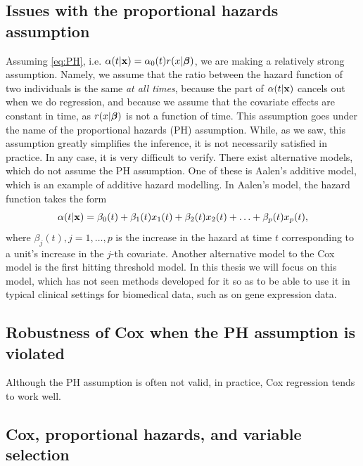 \subsection{Issues with the proportional hazards assumption}
Assuming \eqref{eq:PH}, i.e. $\alpha(t|\mathbf{x})=\alpha_0(t)r(x|\boldsymbol{\beta})$, we are making a relatively strong assumption. Namely, we assume that the ratio between the hazard function of two individuals is the same \textit{at all times}, because the part of $\alpha(t|\mathbf{x})$ cancels out when we do regression, and because we assume that the covariate effects are constant in time, as $r(x|\boldsymbol{\beta})$ is not a function of time.
This assumption goes under the name of the proportional hazards (PH) assumption. While, as we saw, this assumption greatly simplifies the inference, it is not necessarily satisfied in practice. In any case, it is very difficult to verify. There exist alternative models, which do not assume the PH assumption. One of these is Aalen's additive model, which is an example of additive hazard modelling. In Aalen's model, the hazard function takes the form
\begin{equation}
    \alpha(t|\mathbf{x})=\beta_0(t)+\beta_1(t)x_1(t)+\beta_2(t)x_2(t)+\ldots+\beta_p(t)x_p(t),
\end{equation}
where $\beta_j(t),j=1,\ldots,p$ is the increase in the hazard at time $t$ corresponding to a unit's increase in the $j$-th covariate. Another alternative model to the Cox model is the first hitting threshold model. In this thesis we will focus on this model, which has not seen methods developed for it so as to be able to use it in typical clinical settings for biomedical data, such as on gene expression data.

\subsection{Robustness of Cox when the PH assumption is violated}
Although the PH assumption is often not valid, in practice, Cox regression tends to work well. 

\subsection{Cox, proportional hazards, and variable selection}

